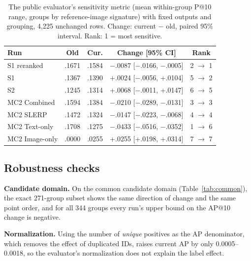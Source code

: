 \documentclass[conference]{IEEEtran}
\begin{document}
\begin{table}[!t]
\centering
\caption{The public evaluator's sensitivity metric (mean within-group P@10 range, groups by reference-image signature) with fixed outputs and grouping, 4,225 unchanged rows. Change: current $-$ old, paired 95\% interval. Rank: 1 = most sensitive.}
\label{tab:evaluator}
\footnotesize
\setlength{\tabcolsep}{3.5pt}
\begin{tabular}{@{}lcccc@{}}
\toprule
Run & Old & Cur. & Change [95\% CI] & Rank\\
\midrule
S1 reranked & .1671 & .1584 & $-$.0087 [$-$.0166, $-$.0005] & 2 $\rightarrow$ 1\\
S1 & .1367 & .1390 & +.0024 [$-$.0056, +.0104] & 5 $\rightarrow$ 2\\
S2 & .1245 & .1314 & +.0068 [$-$.0011, +.0147] & 6 $\rightarrow$ 5\\
MC2 Combined & .1594 & .1384 & $-$.0210 [$-$.0289, $-$.0131] & 3 $\rightarrow$ 3\\
MC2 SLERP & .1472 & .1324 & $-$.0147 [$-$.0223, $-$.0068] & 4 $\rightarrow$ 4\\
MC2 Text-only & .1708 & .1275 & $-$.0433 [$-$.0516, $-$.0352] & 1 $\rightarrow$ 6\\
MC2 Image-only & .0000 & .0255 & +.0255 [+.0198, +.0314] & 7 $\rightarrow$ 7\\
\bottomrule
\end{tabular}
\end{table}

\subsection{Robustness checks}\label{sec:res-checks}
\textbf{Candidate domain.} On the common candidate domain (Table~\ref{tab:common}), the exact 271-group subset shows the same direction of change and the same point order, and for all 344 groups every run's upper bound on the AP@10 change is negative.

\textbf{Normalization.} Using the number of \emph{unique} positives as the AP denominator, which removes the effect of duplicated IDs, raises current AP by only 0.0005--0.0018, so the evaluator's normalization does not explain the label effect.
\end{document}
